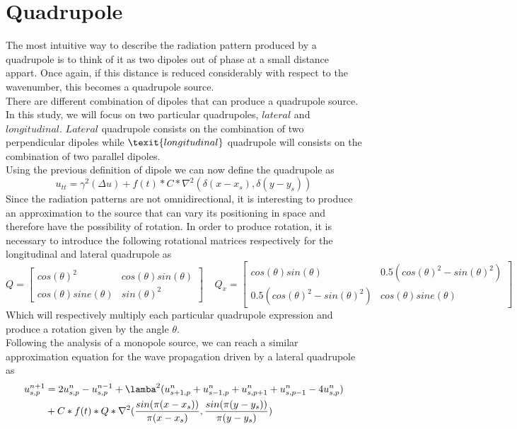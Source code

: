 \section{Quadrupole}
\label{chapter4:sec3}
The most intuitive way to describe the radiation pattern produced by a quadrupole is to think of it as two dipoles out of phase at a small distance appart. Once again, if this distance is reduced considerably with respect to the wavenumber, this becomes a quadrupole source.\\ 
There are different combination of dipoles that can produce a quadrupole source. In this study, we will focus on two particular quadrupoles, $\textit{lateral}$ and $\textit{longitudinal}$. $\textit{Lateral}$ quadrupole consists on the combination of two perpendicular dipoles while $\texit{longitudinal}$ quadrupole will consists on the combination of two parallel dipoles.\\
Using the previous definition of dipole we can now define the quadrupole as
\begin{equation}
\label{eqn:Quadrupole}
	u_{tt}=\gamma^{2}(\Delta u) + f(t)*C*\nabla^{2}(\delta(x-x_{s}),\delta(y-y_{s}))
\end{equation}
Since the radiation patterns are not omnidirectional, it is interesting to produce an approximation to the source that can vary its positioning in space and therefore have the possibility of rotation. In order to produce rotation, it is necessary to introduce the following rotational matrices respectively for the longitudinal and lateral quadrupole as
\begin{equation}
	Q=\begin{bmatrix}
		cos(\theta)^2   & cos(\theta)sin(\theta)\\
		 cos(\theta)sine(\theta) & sin(\theta)^{2}
	\end{bmatrix}
	\ \ \ \ \
	Q_{x}=\begin{bmatrix}
		cos(\theta)sin(\theta)& 0.5(cos(\theta)^{2}-sin(\theta)^{2})\\
		 0.5(cos(\theta)^{2}-sin(\theta)^{2}) &  cos(\theta)sine(\theta) 
	\end{bmatrix}
\end{equation}  
Which will respectively multiply each particular quadrupole expression and produce a rotation given by the angle $\theta$.\\
Following the analysis of a monopole source, we can reach a similar approximation equation for the wave propagation driven by a lateral quadrupole as
\begin{equation}
\label{eqn:FD5dquadlat}
	\begin{aligned}
	u^{n+1}_{s,p}&=2u^{n}_{s,p}-u^{n-1}_{s,p}+\lamba^{2}(u^{n}_{s+1,p}+u^{n}_{s-1,p}+u^{n}_{s,p+1}+u^{n}_{s,p-1}-4u^{n}_{s,p}) \\
			&+ C*f(t)*Q*\nabla^{2}(\frac{sin(\pi(x-x_{s}))}{\pi(x-x_{s})},\frac{sin(\pi(y-y_{s}))}{\pi(y-y_{s})})
	\end{aligned}
\end{equation}

